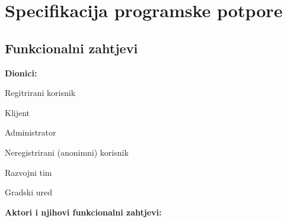 \chapter{Specifikacija programske potpore}
		
	\section{Funkcionalni zahtjevi}
			
			\noindent \textbf{Dionici:}
			
			\begin{packed_enum}
				
				\item Regitrirani korisnik
					\begin{packed_enum}
						\item Klijent
						\item Administrator
					\end{packed_enum}
				\item Neregistrirani (anonimni) korisnik
				\item Razvojni tim
				\item Gradski ured
				
			\end{packed_enum}
			
			\noindent \textbf{Aktori i njihovi funkcionalni zahtjevi:}
			
